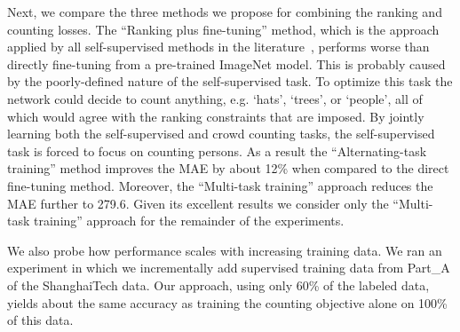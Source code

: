 \documentclass[10pt,twocolumn,letterpaper]{article}
\begin{document}
Next, we compare the three methods we propose for combining the
ranking and counting losses. The ``Ranking plus fine-tuning'' method,
which is the approach applied by all self-supervised methods in the
literature~\cite{doersch2015unsupervised,pathak2016context,zhang2016colorful,noroozi2017representation,liu2017rankiqa},
performs worse than directly fine-tuning from a pre-trained ImageNet
model. This is probably caused by the poorly-defined nature of the
self-supervised task. To optimize this task the network could decide
to count anything, e.g. `hats', `trees', or `people',
all of which would agree with the ranking constraints that are
imposed. By jointly learning both the self-supervised and crowd
counting tasks, the self-supervised task is forced to focus on
counting persons. As a result the ``Alternating-task training'' method
improves the MAE by about 12\% when compared to the direct fine-tuning
method. Moreover, the ``Multi-task training'' approach reduces the MAE
further to 279.6. Given its excellent results we consider only the
``Multi-task training'' approach for the remainder of the experiments.

We also probe how performance scales with increasing training data. We
ran an experiment in which we incrementally add supervised training
data from Part\_A of the ShanghaiTech data. Our approach, using only
60\% of the labeled data, yields about the same accuracy as training
the counting objective alone on 100\% of this data.


\begin{table}
\centering
{}
\caption{MAE and MSE error on the UCF\_CC\_50 dataset.}
\label{table:ucf}
\end{table}
\end{document}
